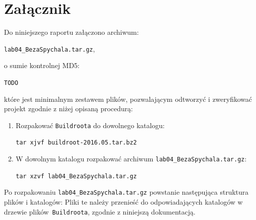 \documentclass{article}
\newcommand{\labnumber}{4}
\newcommand{\buildrootver}{2016.05}
\begin{document}
\section{Załącznik}

Do niniejszego raportu załączono archiwum:
\begin{center}
\texttt{lab0\labnumber\_BezaSpychala.tar.gz},
\end{center}
o sumie kontrolnej MD5:
\begin{center}
\texttt{TODO}
\end{center}
które jest minimalnym zestawem plików, pozwalającym odtworzyć i zweryfikować projekt zgodnie z niżej opisaną procedurą:
\begin{enumerate}
\item Rozpakować \texttt{Buildroota} do dowolnego katalogu:
\begin{center}
\texttt{tar xjvf buildroot-\buildrootver.tar.bz2}
\end{center}

\item W dowolnym katalogu rozpakować archiwum \texttt{lab0\labnumber\_BezaSpychala.tar.gz}:
\begin{center}
\texttt{tar xzvf lab0\labnumber\_BezaSpychala.tar.gz}
\end{center}
\end{enumerate}

Po rozpakowaniu \texttt{lab0\labnumber\_BezaSpychala.tar.gz} powstanie następująca struktura plików i katalogów:
Pliki te należy przenieść do odpowiadających katalogów w drzewie plików~\texttt{Buildroota}, zgodnie z niniejszą dokumentacją.


\newpage


\end{document}
